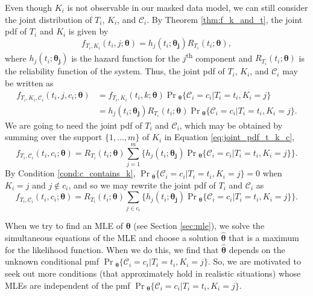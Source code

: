 \documentclass[
]{article}
\begin{document}
Even though \(K_i\) is not observable in our masked data model, we can
still consider the joint distribution of \(T_i\), \(K_i\), and
\(\mathcal{C}_i\). By Theorem \ref{thm:f_k_and_t}, the joint pdf of
\(T_i\) and \(K_i\) is given by \[
f_{T_i,K_i}(t_i,j;\boldsymbol{\theta}) = h_j(t_i;\boldsymbol{\theta_j}) R_{T_i}(t_i;\boldsymbol{\theta}),
\] where \(h_j(t_i;\boldsymbol{\theta_j})\) is the hazard function for
the \(j\)\textsuperscript{th} component and
\(R_{T_i}(t_i;\boldsymbol{\theta})\) is the reliability function of the
system. Thus, the joint pdf of \(T_i\), \(K_i\), and \(\mathcal{C}_i\)
may be written as \begin{equation}
\label{eq:joint_pdf_t_k_c}
\begin{split}
f_{T_i,K_i,\mathcal{C}_i}(t_i,j,c_i;\boldsymbol{\theta})
    &= f_{T_i,K_i}(t_i,k;\boldsymbol{\theta}) \Pr{}_{\!\boldsymbol{\theta}}\{\mathcal{C}_i=c_i|T_i=t_i,K_i=j\}\\
    &= h_j(t_i;\boldsymbol{\theta_j}) R_{T_i}(t_i;\boldsymbol{\theta})
    \Pr{}_{\!\boldsymbol{\theta}}\{\mathcal{C}_i=c_i|T_i=t_i,K_i=j\}.
\end{split}
\end{equation} We are going to need the joint pdf of \(T_i\) and
\(\mathcal{C}_i\), which may be obtained by summing over the support
\(\{1,\ldots,m\}\) of \(K_i\) in Equation \eqref{eq:joint_pdf_t_k_c}, \[
f_{T_i,\mathcal{C}_i}(t_i,c_i;\boldsymbol{\theta}) = R_{T_i}(t_i;\boldsymbol{\theta})
    \sum_{j=1}^m \biggl\{
        h_j(t_i;\boldsymbol{\theta_j}) \Pr{}_{\!\boldsymbol{\theta}}\{\mathcal{C}_i=c_i|T_i=t_i,K_i=j\}
    \biggr\}.
\] By Condition \ref{cond:c_contains_k},
\(\Pr{}_{\!\boldsymbol{\theta}}\{\mathcal{C}_i=c_i|T_i=t_i,K_i=j\} = 0\)
when \(K_i = j\) and \(j \notin c_i\), and so we may rewrite the joint
pdf of \(T_i\) and \(\mathcal{C}_i\) as \begin{equation}
\label{eq:part1}
f_{T_i,\mathcal{C}_i}(t_i,c_i;\boldsymbol{\theta}) = R_{T_i}(t_i;\boldsymbol{\theta})
    \sum_{j \in c_i} \biggl\{
        h_j(t_i;\boldsymbol{\theta_j}) \Pr{}_{\!\boldsymbol{\theta}}\{\mathcal{C}_i=c_i|T_i=t_i,K_i=j\}
    \biggr\}.
\end{equation}

When we try to find an MLE of \(\boldsymbol{\theta}\) (see Section
\ref{sec:mle}), we solve the simultaneous equations of the MLE and
choose a solution \(\hat{\boldsymbol{\theta}}\) that is a maximum for
the likelihood function. When we do this, we find that
\(\hat{\boldsymbol{\theta}}\) depends on the unknown conditional pmf
\(\Pr{}_{\!\boldsymbol{\theta}}\{\mathcal{C}_i=c_i|T_i=t_i,K_i=j\}\).
So, we are motivated to seek out more conditions (that approximately
hold in realistic situations) whose MLEs are independent of the pmf
\(\Pr{}_{\!\boldsymbol{\theta}}\{\mathcal{C}_i=c_i|T_i=t_i,K_i=j\}\).
\end{document}
